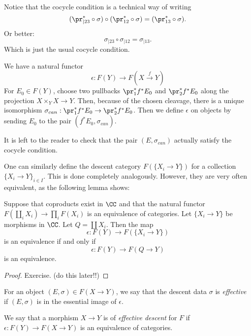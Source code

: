 \documentclass[11pt, english]{article}
\begin{document}
\begin{remark}
Notice that the cocycle condition is a technical way of writing 
\[
(\pr_{|23}^\ast \circ \sigma) \circ (\pr_{12}^\ast \circ \sigma) = (\pr_{13}^\ast \circ \sigma).
\]
Or better:
\[
\sigma_{|23} \circ \sigma_{|12} = \sigma_{|13}.
\]
Which is just the usual cocycle condition.
\end{remark}

We have a natural functor
\begin{equation}
\label{eq:epsilon}
\epsilon:F(Y) \to F(X \xrightarrow{f} Y)
\end{equation}
For $E_0 \in F(Y)$, choose two pullbacks $\pr_1^\ast f^\ast E_0$ and $\pr_2 ^\ast f^\ast E_0$ along the projection $X \times_Y X \to Y$. Then, because of the chosen cleavage, there is a unique isomorphism $\sigma_{can}:\pr_1^\ast f^\ast E_0 \to \pr_2 ^\ast f^\ast E_0$. Then we define $\epsilon$ on objects by sending $E_0$ to the pair $(f^\ast E_0, \sigma_{can})$. 

It is left to the reader to check that the pair $(E,\sigma_{can})$ actually satisfy the cocycle condition.

\begin{remark} One can similarly define the descent category $F(\{ X_i \to Y\})$ for a collection $\{X_i \to Y\}_{i \in I}$. This is done completely analogously. However, they are very often equivalent, as the following lemma shows:
\end{remark}

\begin{lemma}
Suppose that coproducts exist in $\CC$ and that the natural functor $F(\coprod_i X_i) \to \prod
_i F(X_i)$ is an equivalence of categories. Let $\{X_i \to Y\}$ be morphisms in $\CC$. Let $Q = \coprod X_i$. Then the map
\[ \epsilon: F(Y) \to F(\{ X_i \to Y\}) \]
is an equivalence if and only if
\[ \epsilon: F(Y) \to F(Q \to Y) \]
is an equivalence.
\end{lemma}
\begin{proof}
Exercise. (do this later!!)
\end{proof}

\begin{defi}
For an object $(E,\sigma) \in F(X \to Y)$, we say that the descent data $\sigma$ is \emph{effective} if $(E,\sigma)$ is in the essential image of $\epsilon$.
\end{defi}

\begin{defi}
We say that a morphism $X \to Y$ is of \emph{effective descent} for $F$ if $\epsilon:F(Y) \to F(X \to Y)$ is an equivalence of categories.
\end{defi}
\end{document}
